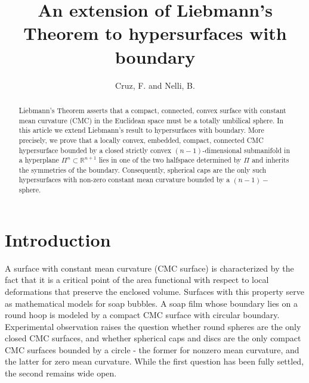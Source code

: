 \documentclass[11pt]{amsart}
\theoremstyle{plain}
\numberwithin{equation}{section}
\numberwithin{theorem}{section}
\begin{document}
\title
[An extension of Liebmann's Theorem to hypersurfaces with boundary]
{An extension of Liebmann's Theorem to hypersurfaces with boundary}

\author[Cruz, F. and Nelli, B. ]{Cruz, F. and Nelli, B.}
\address{Fl\'avio F. Cruz \\ Departamento de Matem\'atica,  Universidade Regional do Cariri, Campus Crajubar, 63041-141 -Juazeiro do Norte, Cear\'a (Brazil)}

\address{Barbara Nelli \\  Dipartimento di Ingegneria e Scienze dell’Informazione e Matematica,
Universit\`a dell’Aquila, via Vetoio Loc. Coppito, 67100 L’AQUILA (Italia)}


\begin{abstract}
Liebmann's Theorem asserts  that a compact, connected, convex surface with constant mean curvature (CMC) in the Euclidean space must be a totally umbilical sphere. In this article  we  extend Liebmann's result to hypersurfaces with boundary. More precisely,  we prove that a locally convex, embedded, compact, connected CMC hypersurface bounded by a closed strictly convex  $(n-1)$-dimensional submanifold in a hyperplane $\Pi^n\subset \mathbb{R}^{n+1}$ lies in one of the two  halfspace  determined by $\Pi$ and inherits the symmetries of the boundary. Consequently, spherical caps are the only such hypersurfaces with non-zero constant mean curvature bounded by a $(n-1)-$sphere.
\end{abstract}

\maketitle

\section{Introduction}
\label{section1}





A  surface with constant mean curvature (CMC surface) is characterized by the fact that it is a critical point of the area functional with respect to local deformations that preserve the enclosed volume. Surfaces with this property serve as mathematical models for  soap bubbles. A soap film whose boundary lies on a round hoop is modeled by a compact CMC surface with circular boundary.  Experimental observation raises the question whether round spheres are the only closed CMC surfaces, and whether spherical caps and discs are the only compact CMC surfaces bounded by a circle -  the former for nonzero mean curvature, and the latter for zero mean curvature.
While the first question has been fully settled, the second remains wide open.
\end{document}
